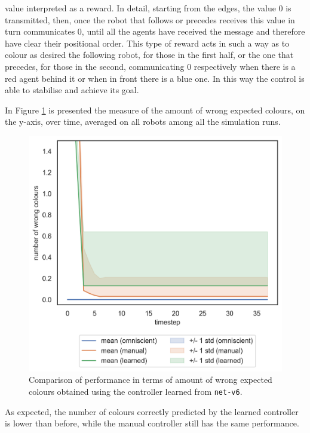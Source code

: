 \noindent
value interpreted as a reward. In detail, starting from the edges, the value 0 is 
transmitted, then, once the robot that follows or precedes receives this value in 
turn communicates 0, until all the agents have received the message and 
therefore have clear their positional order.
This type of reward acts in such a way as to colour as desired the following robot, 
for those in the first half, or the one that precedes, for those in the second, 
communicating 0 respectively when there is a red agent behind it or when in front 
there is a blue one. In this way the control is able to stabilise and achieve its goal.

In Figure \ref{fig:net-v6error} is presented the measure of the amount of wrong 
expected colours, on the y-axis, over time, averaged on all robots among all the 
simulation runs. 
\begin{figure}[!htb]
	\centering
	\includegraphics[width=.5\textwidth]{contents/images/net-v6/colours-errors-compressed}%
	\caption[Evaluation of \texttt{net-v6} amount of wrong expected 
	colours.]{Comparison of performance in terms of amount of wrong expected 
		colours obtained using the controller learned from \texttt{net-v6}.}
	\label{fig:net-v6error}
\end{figure}

\noindent
As expected, the number of colours correctly predicted by the learned controller 
is lower than before, while the manual controller still has the same performance.  

